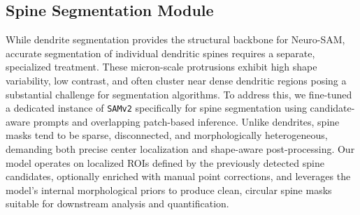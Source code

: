 \subsection{Spine Segmentation Module}
While dendrite segmentation provides the structural backbone for Neuro-\gls{SAM}, accurate segmentation of individual dendritic spines requires a separate, specialized treatment. These micron-scale protrusions exhibit high shape variability, low contrast, and often cluster near dense dendritic regions posing a substantial challenge for segmentation algorithms. To address this, we fine-tuned a dedicated instance of \texttt{SAMv2} specifically for spine segmentation using candidate-aware prompts and overlapping patch-based inference. Unlike dendrites, spine masks tend to be sparse, disconnected, and morphologically heterogeneous, demanding both precise center localization and shape-aware post-processing. Our model operates on localized \gls{ROI}s defined by the previously detected spine candidates, optionally enriched with manual point corrections, and leverages the model's internal morphological priors to produce clean, circular spine masks suitable for downstream analysis and quantification.




